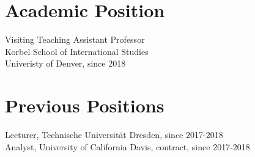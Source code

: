 \documentclass[margin, 10pt]{CVStyleTemplate}\usepackage[]{graphicx}\usepackage[]{color}
\begin{document}
\begin{resume}

\section{Academic Position}

Visiting Teaching Assistant Professor \\
Korbel School of International Studies \\
Univeristy of Denver, since 2018 \\

\section{Previous Positions}


Lecturer, Technische Universit\"{a}t Dresden, since 2017-2018 \\
Analyst, University of California Davis, contract, since 2017-2018




\end{resume}
\end{document}

